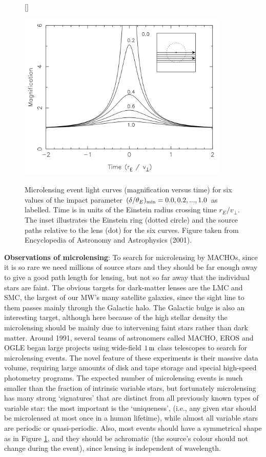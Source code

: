 \documentclass[a4paper,10pt]{article}
\begin{document}
\begin{figure}[t]
    [\FBwidth]
    {\caption{\footnotesize{Microlensing event light curves (magnification versus time) for six values of the impact parameter $(\delta/\theta_E)_{\rm min}=0.0,0.2,...,1.0$ as labelled. Time is in units of the Einstein radius crossing time $r_E/v_\perp$. The inset illustrates the Einstein ring (dotted circle) and the source paths relative to the lens (dot) for the six curves. Figure taken from Encyclopedia of Astronomy and Astrophysics (2001).}}
    \label{fig:microlensinglightcurve}}
    {\includegraphics[width=10cm]{figures/MicrolensingLightcurve.png}}
\end{figure}

{\noindent}\textbf{Observations of microlensing}: To search for microlensing by MACHOs, since it is so rare we need millions of source stars and they should be far enough away to give a good path length for lensing, but not so far away that the individual stars  are faint. The obvious targets for dark-matter lenses are the LMC and SMC, the largest of our MW's many satellite galaxies, since the sight line to them passes mainly through the Galactic halo. The Galactic bulge is also an interesting target, although here because of the high stellar density the microlensing should be mainly due to intervening faint stars rather than dark matter. Around 1991, several teams of astronomers called MACHO, EROS and OGLE began large projects using wide-field $1\,{\rm m}$ class telescopes to search for microlensing events. The novel feature of these experiments is their massive data volume, requiring large amounts of disk and tape storage and special high-speed photometry programs. The expected number of microlensing events is much smaller than the fraction of intrinsic variable stars, but fortunately microlensing has many strong `signatures' that are distinct from all previously known types of variable star: the most important is the `uniqueness', (i.e., any given star should be microlensed at most once in a human lifetime), while almost all variable stars are periodic or quasi-periodic. Also, most events should have a symmetrical shape as in Figure \ref{fig:microlensinglightcurve}, and they should be achromatic (the source's colour should not change during the event), since lensing is independent of wavelength.
\end{document}
